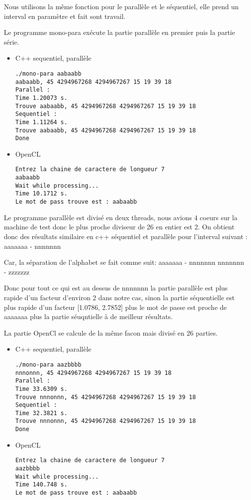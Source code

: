 \documentclass[11pt,letterpaper,sans]{article}   %
\begin{document}
Nous utilisons la même fonction pour le parallèle et le séquentiel, elle prend un interval en paramètre et fait sont travail.

Le programme mono-para exécute la partie parallèle en premier puis la partie série.
\begin{itemize}
\item C++ sequentiel, parallèle
\begin{lstlisting}
./mono-para aabaabb
aabaabb, 45 4294967268 4294967267 15 19 39 18 
Parallel : 
Time 1.20073 s.
Trouve aabaabb, 45 4294967268 4294967267 15 19 39 18 
Sequentiel : 
Time 1.11264 s.
Trouve aabaabb, 45 4294967268 4294967267 15 19 39 18 
Done
\end{lstlisting}

\item OpenCL
\begin{lstlisting}
Entrez la chaine de caractere de longueur 7
aabaabb
Wait while processing...
Time 10.1712 s.
Le mot de pass trouve est : aabaabb
\end{lstlisting}

\end{itemize}

Le programme parallèle est divisé en deux threads, nous avions 4 coeurs sur la machine de test donc le plus proche diviseur de 26 en entier est 2.
On obtient donc des résultats similaire en c++ séquentiel et parallèle pour l'interval suivant :
aaaaaaa - nnnnnnn

Car, la séparation de l'alphabet se fait comme suit:
aaaaaaa - nnnnnnn
nnnnnnn - zzzzzzz

Donc pour tout ce qui est au dessus de nnnnnnn la partie parallèle est plus rapide d'un facteur d'environ 2 dans notre cas, sinon la partie séquentielle est plus rapide d'un facteur [1.0786, 2.7852] plus le mot de passe est proche de aaaaaaa plus la partie séuqntielle à de meilleur résultats.

La partie OpenCl se calcule de la même facon mais divisé en 26 parties.

\begin{itemize}
\item C++ sequentiel, parallèle
\begin{lstlisting}
./mono-para aazbbbb
nnnonnn, 45 4294967268 4294967267 15 19 39 18 
Parallel : 
Time 33.6309 s.
Trouve nnnonnn, 45 4294967268 4294967267 15 19 39 18 
Sequentiel : 
Time 32.3821 s.
Trouve nnnonnn, 45 4294967268 4294967267 15 19 39 18 
Done
\end{lstlisting}

\item OpenCL
\begin{lstlisting}
Entrez la chaine de caractere de longueur 7
aazbbbb
Wait while processing...
Time 140.748 s.
Le mot de pass trouve est : aabaabb
\end{lstlisting}
\end{itemize}
\end{document}
